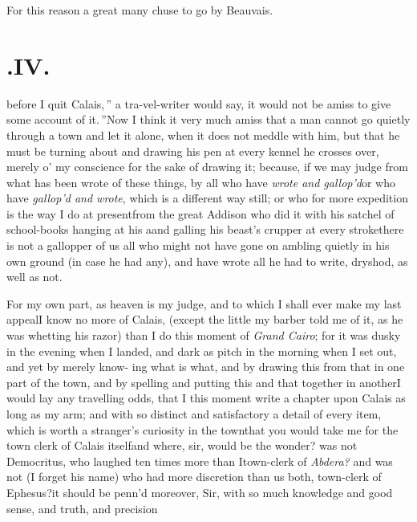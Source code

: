 \documentclass{article}
\begin{document}
For this reason a great many chuse to go by Beauvais.

\section{.\enspace IV.}

 before I quit
Calais,\,” a tra-\break vel-writer would say, \lqq it would\break
\lqq not be amiss to give some account of\break
\lqq it.\,”\tsk Now I think it very much amiss\break
\tsk that a man
cannot go quietly through a town and let it alone, when it does not meddle with him,
but that he must be turning about and drawing his pen at every kennel he crosses
over, merely o’ my conscience for the sake of drawing it; because, if we may judge
from what has been wrote of these things, by all who have \textit{wrote and
gallop’d}\tsk or who have \textit{gallop’d and wrote}, which is a different way still;
or who for more expedition
 is
the way I do at present\tsk from the great Addison who did it with his
satchel of school-books hanging at his a\tsk and galling his beast’s crupper at
every stroke\break\tsk there is not a gallopper of us all who might not have gone on ambling
quietly in his own ground (in case he had any), and have wrote all he had to write,
dry\break shod, as well as not.

For my own part, as heaven is my judge, and to which I shall ever make my last
appeal\tsk I know no more of Calais, (except the little my barber told me of it, as he
was whetting his razor) than I do this moment of \textit{Grand Cairo}; for it was
dusky in the evening when I landed, and dark as pitch in the morning when I set out,
and yet by merely know-
ing what is what, and by drawing this from that in one part of
the town, and by spelling and putting this and that together in another\tsk I would
lay any tra\-velling odds, that I this moment write a chapter upon Calais as
long as my arm; and with so distinct and satisfactory a detail of every item, which
is worth a stranger’s curiosity in the town\tsk that you would take me for the
town clerk of Calais itself\tsk and where, sir, would be the wonder? was not
Democritus, who laughed ten times more than I\tsk town-clerk of
\textit{Abdera?} and was not (I forget his name) who had more discretion than us
both, town-clerk of Ephesus?\tsh it should be penn’d moreover, Sir, with so
much knowledge and good sense, and truth, and precision\tsh{}
\end{document}
